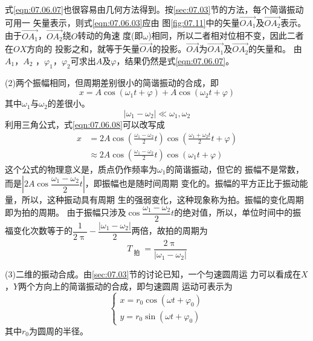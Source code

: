 式\eqref{eqn:07.06.07}也很容易由几何方法得到。按\ref{sec:07.03}节的方法，每个简谐振动可用一
矢量表示，则式\eqref{eqn:07.06.03}应由
图\ref{fig:07.11}\;中的矢量$ \vec{OA_1} $及$ \vec{OA_2} $表示。由于$ \vec{ O A _ { 1 } } $，$ \vec{ O A _ { 2 } } $绕$ O $转动的角速
度(即$ \omega $)相同，所以二者相对位相不变，因此二者在$ OX $方向的
投影之和，就等于矢量$\vec{OA}$的投影。$ \vec{OA} $为$\vec{OA_1}$及$\vec{OA_2}$的矢量和。
由$  A _ { 1 }   $，$  A _ { 2 }  $ ，$\varphi_{ 1 }$，$\varphi_{ 2 }$可求出$ A $及$\varphi$，结果仍然是式\eqref{eqn:07.06.07}。

(2)两个振幅相同，但周期差别很小的简谐振动的合成，即
\begin{equation}\label{eqn:07.06.08}
    x = A \cos \left( \omega _ { 1 } t + \varphi \right) + A  \cos \left( \omega _ { 2 } t + \varphi \right)
\end{equation}
其中$\omega_{ 1 }$与$\omega_{ 2 }$的差很小。
\begin{equation*}
    \left| \omega _ { 1 } - \omega _ { 2 } \right| \ll \omega _ { 1 } , \omega _ { 2 }
\end{equation*}
利用三角公式，式\eqref{eqn:07.06.08}可以改写成
\begin{equation*}
    \begin{split}
        x &= 2 A  \cos \left( \frac { \omega _ { 1 } - \omega _ { 2 } } { 2 } t \right)  \cos \left( \frac { \omega _ { 1 } + \omega _ { 2 } t } { 2 } t  + \varphi \right)  \\
        & \approx 2 A  \cos \left( \frac { \omega _ { 1 } - \omega _ { 2 } } { 2 } t \right)  \cos \left( \omega _ { 1 } t + \varphi \right)
    \end{split}
\end{equation*}
这个公式的物理意义是，质点仍作频率为$\omega_{ 1 }$的简谐振动，但它的
振幅不是常数，而是$ \left| 2 A  \cos \dfrac { \omega _ { 1 } - \omega _ { 2 } } { 2 } t \right| $，即振幅也是随时间周期
变化的。振幅的平方正比于振动能量，所以，这种振动具有周期
生的强弱变化，这种现象称为拍。振幅的变化周期即为拍的周期。
由于振幅只涉及$ \cos \dfrac { \omega _ { 1 } - \omega _ { 2 } } { 2 } t $的绝对值，所以，单位时间中的振
福变化次数等于的$ \dfrac { 1 } { 2 \uppi } - \dfrac { \left| \omega _ { 1 } - \omega _ { 2 } \right| } { 2 } $两倍，故拍的周期为
\begin{equation*}
    T _ { \text { 拍 } } = \frac { 2 \uppi } { \left| \omega _ { 1 } - \omega _ { 2 } \right| }
\end{equation*}

(3)二维的振动合成。由\ref{sec:07.03}节的讨论已知，一个匀速圆周运
力可以看成在$ X $，$ Y $两个方向上的简谐振动的合成，即匀速圆周
运动可表示为
~\vspace{-0.56em}
\begin{equation}\label{eqn:07.06.09}
    \begin{cases}
        x = r _ { 0 } \cos \left( \omega t + \varphi _ { 0 } \right) \\
        y = r _ { 0 } \sin \left( \omega t + \varphi _ { 0 } \right)
    \end{cases}
\end{equation}
其中$ r _ { 0 } $为圆周的半径。

